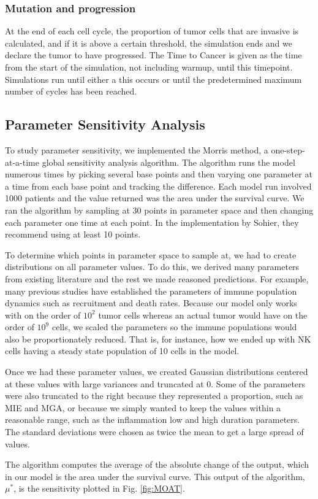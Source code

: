 \documentclass[11pt]{article}
\begin{document}
\subsubsection{Mutation and progression}
At the end of each cell cycle, the proportion of tumor cells that are invasive is calculated, and if it is above a certain threshold, the simulation ends and we declare the tumor to have progressed.
The Time to Cancer is given as the time from the start of the simulation, not including warmup, until this timepoint.
Simulations run until either a this occurs or until the predetermined maximum number of cycles has been reached.

\subsection{Parameter Sensitivity Analysis}
To study parameter sensitivity, we implemented the Morris method, a one-step-at-a-time global sensitivity analysis algorithm.
The algorithm runs the model numerous times by picking several base points and then varying one parameter at a time from each base point and tracking the difference\cite{morris1991factorial, sohier2014improvement}.
Each model run involved 1000 patients and the value returned was the area under the survival curve.
We ran the algorithm by sampling at 30 points in parameter space and then changing each parameter one time at each point.
In the implementation by Sohier, they recommend using at least 10 points\cite{sohier2014improvement}.
\par
To determine which points in parameter space to sample at, we had to create distributions on all parameter values.
To do this, we derived many parameters from existing literature and the rest we made reasoned predictions.
For example, many previous studies have established the parameters of immune population dynamics such as recruitment and death rates\cite{de2014modeling}.
Because our model only works with on the order of $10^2$ tumor cells whereas an actual tumor would have on the order of $10^9$ cells\cite{de2014modeling}, we scaled the parameters so the immune populations would also be proportionately reduced.
That is, for instance, how we ended up with NK cells having a steady state population of 10 cells in the model.
\par
Once we had these parameter values, we created Gaussian distributions centered at these values with large variances and truncated at 0.
Some of the parameters were also truncated to the right because they represented a proportion, such as MIE and MGA, or because we simply wanted to keep the values within a reasonable range, such as the inflammation low and high duration parameters.
The standard deviations were chosen as twice the mean to get a large spread of values.
\par
The algorithm computes the average of the absolute change of the output, which in our model is the area under the survival curve.
This output of the algorithm, $\mu^*$, is the sensitivity plotted in Fig. \ref{fig:MOAT}.
\end{document}
